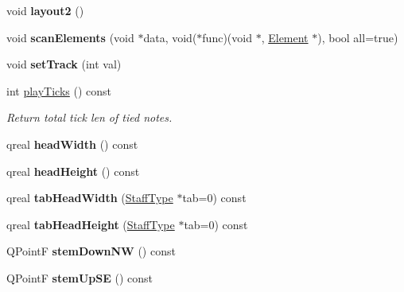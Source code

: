 \begin{DoxyCompactItemize}
void {\bfseries layout2} ()
\item 
\mbox{\label{class_ms_1_1_note_a3fedb31d2ea2bf099b041bdf15b7b5bf}} 
void {\bfseries scan\+Elements} (void $\ast$data, void($\ast$func)(void $\ast$, \hyperlink{class_ms_1_1_element}{Element} $\ast$), bool all=true)
\item 
\mbox{\label{class_ms_1_1_note_a71c6abddc4ff728b88536b34ff365793}} 
void {\bfseries set\+Track} (int val)
\item 
\mbox{\label{class_ms_1_1_note_ab2e6541958f8118eaff62baa58ec3307}} 
int \hyperlink{class_ms_1_1_note_ab2e6541958f8118eaff62baa58ec3307}{play\+Ticks} () const
\begin{DoxyCompactList}\small\item\em Return total tick len of tied notes. \end{DoxyCompactList}\item 
\mbox{\label{class_ms_1_1_note_a43dfad32ea3c1f8e2b56e810cd7bfa6e}} 
qreal {\bfseries head\+Width} () const
\item 
\mbox{\label{class_ms_1_1_note_aebe714f6dc759dbf09ffcda4491952fd}} 
qreal {\bfseries head\+Height} () const
\item 
\mbox{\label{class_ms_1_1_note_ae178aabd07cb76763a4e45fb736cb6d3}} 
qreal {\bfseries tab\+Head\+Width} (\hyperlink{class_ms_1_1_staff_type}{Staff\+Type} $\ast$tab=0) const
\item 
\mbox{\label{class_ms_1_1_note_a8678ea3cbfc0c36e4f30ccc50d8bc660}} 
qreal {\bfseries tab\+Head\+Height} (\hyperlink{class_ms_1_1_staff_type}{Staff\+Type} $\ast$tab=0) const
\item 
\mbox{\label{class_ms_1_1_note_a4ca22e086275dc1906b1476acb032cc6}} 
Q\+PointF {\bfseries stem\+Down\+NW} () const
\item 
\mbox{\label{class_ms_1_1_note_a1c9ea06bca227155fbfb20e72a1ff4a6}} 
Q\+PointF {\bfseries stem\+Up\+SE} () const
\item 
\mbox{\label{class_ms_1_1_note_aa3ab372fd5e04a1563fe8c7581c5aae7}} 

\end{DoxyCompactItemize}
